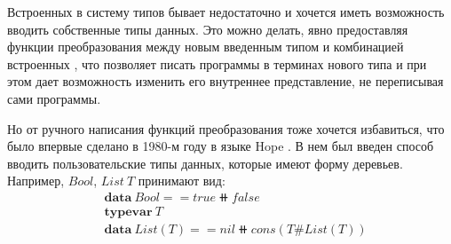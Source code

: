 Встроенных в систему типов бывает недостаточно и хочется иметь
возможность вводить собственные типы данных. Это можно делать, явно
предоставляя функции преобразования между новым введенным типом и
комбинацией встроенных
\cite{transformation-system-for-developing-recursive-programs},
что позволяет писать программы в терминах нового типа и при этом дает возможность
изменить его внутреннее представление, не переписывая сами программы.

Но от ручного написания функций преобразования тоже хочется избавиться,
что было впервые сделано в 1980-м году в языке Hope
\cite{hope-an-experimental-applicative-language}.
В нем был введен способ вводить пользовательские типы данных, которые имеют форму деревьев.
Например, \(Bool\), \(List\ T\) принимают вид:
\begin{align*}
&\mathbf{data}\ Bool == true \doubleplus false\\
&\mathbf{typevar}\ T\\
&\mathbf{data}\ List(T) == nil \doubleplus cons(T \# List(T))
\end{align*}
